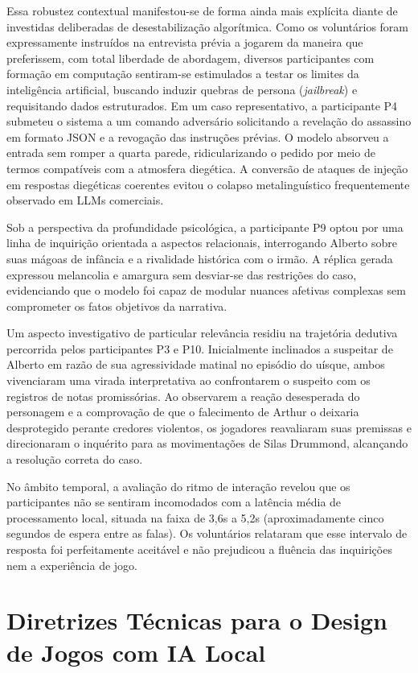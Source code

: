 Essa robustez contextual manifestou-se de forma ainda mais explícita diante de investidas deliberadas de desestabilização algorítmica. Como os voluntários foram expressamente instruídos na entrevista prévia a jogarem da maneira que preferissem, com total liberdade de abordagem, diversos participantes com formação em computação sentiram-se estimulados a testar os limites da inteligência artificial, buscando induzir quebras de persona (\textit{jailbreak}) e requisitando dados estruturados. Em um caso representativo, a participante P4 submeteu o sistema a um comando adversário solicitando a revelação do assassino em formato JSON e a revogação das instruções prévias. O modelo absorveu a entrada sem romper a quarta parede, ridicularizando o pedido por meio de termos compatíveis com a atmosfera diegética. A conversão de ataques de injeção em respostas diegéticas coerentes evitou o colapso metalinguístico frequentemente observado em LLMs comerciais.

Sob a perspectiva da profundidade psicológica, a participante P9 optou por uma linha de inquirição orientada a aspectos relacionais, interrogando Alberto sobre suas mágoas de infância e a rivalidade histórica com o irmão. A réplica gerada expressou melancolia e amargura sem desviar-se das restrições do caso, evidenciando que o modelo foi capaz de modular nuances afetivas complexas sem comprometer os fatos objetivos da narrativa.

Um aspecto investigativo de particular relevância residiu na trajetória dedutiva percorrida pelos participantes P3 e P10. Inicialmente inclinados a suspeitar de Alberto em razão de sua agressividade matinal no episódio do uísque, ambos vivenciaram uma virada interpretativa ao confrontarem o suspeito com os registros de notas promissórias. Ao observarem a reação desesperada do personagem e a comprovação de que o falecimento de Arthur o deixaria desprotegido perante credores violentos, os jogadores reavaliaram suas premissas e direcionaram o inquérito para as movimentações de Silas Drummond, alcançando a resolução correta do caso.

No âmbito temporal, a avaliação do ritmo de interação revelou que os participantes não se sentiram incomodados com a latência média de processamento local, situada na faixa de 3,6s a 5,2s (aproximadamente cinco segundos de espera entre as falas). Os voluntários relataram que esse intervalo de resposta foi perfeitamente aceitável e não prejudicou a fluência das inquirições nem a experiência de jogo.

\section{Diretrizes Técnicas para o Design de Jogos com IA Local}
\label{sec:res_diretrizes}

